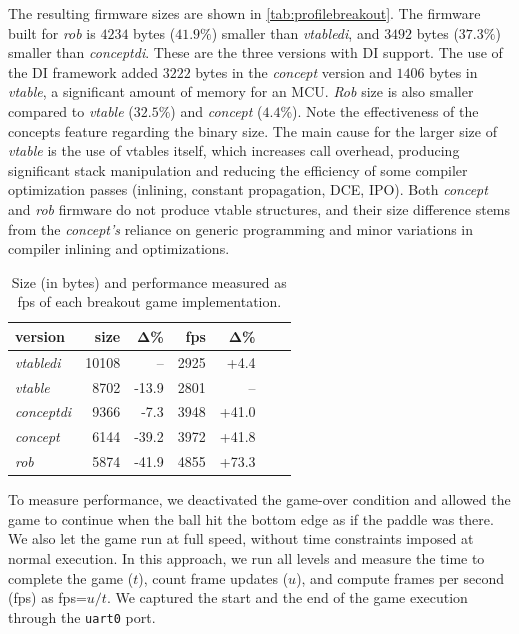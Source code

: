 \documentclass[sigconf]{acmart}
\begin{document}
The resulting firmware sizes are shown in \autoref{tab:profilebreakout}. The firmware built for \emph{rob} is $4234$ bytes ($41.9\%$) smaller than \emph{vtabledi}, and $3492$ bytes ($37.3\%$) smaller than \emph{conceptdi}. These are the three versions with DI support. The use of the DI framework added $3222$ bytes in the \emph{concept} version and $1406$ bytes in \emph{vtable}, a significant amount of memory for an MCU. \emph{Rob} size is also smaller compared to \emph{vtable} ($32.5\%$) and \emph{concept} ($4.4$\%). Note the effectiveness of the concepts feature regarding the binary size. The main cause for the larger size of \emph{vtable} is the use of vtables itself, which increases call overhead, producing significant stack manipulation and reducing the efficiency of some compiler optimization passes (inlining, constant propagation, DCE, IPO). Both \emph{concept} and \emph{rob} firmware do not produce vtable structures, and their size difference stems from the \emph{concept's} reliance on generic programming and minor variations in compiler inlining and optimizations.


\begin{table}[tp]
\caption{Size (in bytes) and performance measured as fps of each breakout game implementation.}
\label{tab:profilebreakout}
\begin{tabular}{lrrrrrr}
\toprule
\bf version & \bf size & Δ\% & \bf fps & Δ\% \\
\midrule
\emph{vtabledi}   & 10108 & --     & 2925 & +4.4     \\
\emph{vtable}     & 8702  & -13.9  & 2801 & --   \\
\emph{conceptdi}  & 9366  & -7.3   & 3948 & +41.0  \\
\emph{concept}    & 6144  & -39.2  & 3972 & +41.8  \\
\emph{rob}        & 5874  & -41.9  & 4855 & +73.3  \\
\bottomrule
\end{tabular}
\end{table}

To measure performance, we deactivated the game-over condition and allowed the game to continue when the ball hit the bottom edge as if the paddle was there. We also let the game run at full speed, without time constraints imposed at normal execution. In this approach, we run all levels and measure the time to complete the game ($t$), count frame updates ($u$), and compute frames per second (fps) as fps=$u/t$. We captured the start and the end of the game execution through the {\tt uart0} port. 
\end{document}
